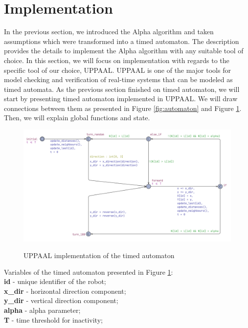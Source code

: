 \section{Implementation}
In the previous section, we introduced the Alpha algorithm and taken assumptions which were transformed into a timed automaton. The description provides the details to implement the Alpha algorithm with any suitable tool of choice. In this section, we will focus on implementation with regards to the specific tool of our choice, UPPAAL. UPPAAL is one of the major tools for model checking and verification of real-time systems that can be modeled as timed automata. As the previous section finished on timed automaton, we will start by presenting timed automaton implemented in UPPAAL. We will draw connections between them as presented in Figure \ref{fig:automaton} and Figure \ref{fig:automaton_uppaal}. Then, we will explain global functions and state.

\begin{figure}[H]
\caption{UPPAAL implementation of the timed automaton}
\includegraphics[scale=0.3]{images/automaton_uppaal.png}
\label{fig:automaton_uppaal}
\end{figure}

\noindent
Variables of the timed automaton presented in Figure \ref{fig:automaton_uppaal}:\\
\textbf{id} - unique identifier of the robot;\\
\textbf{x\_dir} - horizontal direction component;\\
\textbf{y\_dir} - vertical direction component;\\
\textbf{alpha} - alpha parameter;\\
\textbf{T} - time threshold for inactivity;\\


